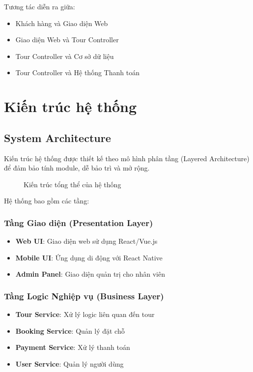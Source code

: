 \documentclass[12pt,a4paper]{article}
\begin{document}
Tương tác diễn ra giữa:
\begin{itemize}
    \item Khách hàng và Giao diện Web
    \item Giao diện Web và Tour Controller
    \item Tour Controller và Cơ sở dữ liệu
    \item Tour Controller và Hệ thống Thanh toán
\end{itemize}

\newpage
\section{Kiến trúc hệ thống}

\subsection{System Architecture}

Kiến trúc hệ thống được thiết kế theo mô hình phân tầng (Layered Architecture) để đảm bảo tính module, dễ bảo trì và mở rộng.

\begin{figure}[H]
    \centering
    
    \caption{Kiến trúc tổng thể của hệ thống}
    \label{fig:system_architecture}
\end{figure}

Hệ thống bao gồm các tầng:

\subsubsection{Tầng Giao diện (Presentation Layer)}
\begin{itemize}
    \item \textbf{Web UI}: Giao diện web sử dụng React/Vue.js
    \item \textbf{Mobile UI}: Ứng dụng di động với React Native
    \item \textbf{Admin Panel}: Giao diện quản trị cho nhân viên
\end{itemize}

\subsubsection{Tầng Logic Nghiệp vụ (Business Layer)}
\begin{itemize}
    \item \textbf{Tour Service}: Xử lý logic liên quan đến tour
    \item \textbf{Booking Service}: Quản lý đặt chỗ
    \item \textbf{Payment Service}: Xử lý thanh toán
    \item \textbf{User Service}: Quản lý người dùng
\end{itemize}
\end{document}

